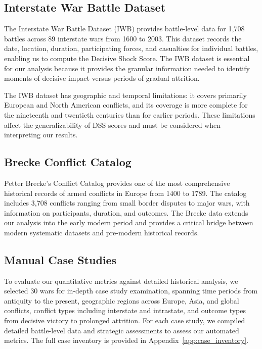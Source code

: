 \subsection{Interstate War Battle Dataset}

The Interstate War Battle Dataset (IWB) \citep{rester2019} provides battle-level data for 1,708 battles across 89 interstate wars from 1600 to 2003. This dataset records the date, location, duration, participating forces, and casualties for individual battles, enabling us to compute the Decisive Shock Score. The IWB dataset is essential for our analysis because it provides the granular information needed to identify moments of decisive impact versus periods of gradual attrition.

The IWB dataset has geographic and temporal limitations: it covers primarily European and North American conflicts, and its coverage is more complete for the nineteenth and twentieth centuries than for earlier periods. These limitations affect the generalizability of DSS scores and must be considered when interpreting our results.

\subsection{Brecke Conflict Catalog}

Petter Brecke's Conflict Catalog \citep{brecke1999} provides one of the most comprehensive historical records of armed conflicts in Europe from 1400 to 1789. The catalog includes 3,708 conflicts ranging from small border disputes to major wars, with information on participants, duration, and outcomes. The Brecke data extends our analysis into the early modern period and provides a critical bridge between modern systematic datasets and pre-modern historical records.

\subsection{Manual Case Studies}

To evaluate our quantitative metrics against detailed historical analysis, we selected 30 wars for in-depth case study examination, spanning time periods from antiquity to the present, geographic regions across Europe, Asia, and global conflicts, conflict types including interstate and intrastate, and outcome types from decisive victory to prolonged attrition. For each case study, we compiled detailed battle-level data and strategic assessments to assess our automated metrics. The full case inventory is provided in Appendix~\ref{app:case_inventory}.

